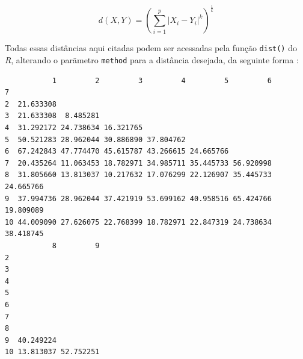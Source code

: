 \documentclass[
  letterpaper,
  DIV=11,
  numbers=noendperiod]{scrreprt}
\newenvironment{Shaded}{\begin{snugshade}}{\end{snugshade}}
\newcommand{\AttributeTok}[1]{\textcolor[rgb]{0.40,0.45,0.13}{#1}}
\newcommand{\DecValTok}[1]{\textcolor[rgb]{0.68,0.00,0.00}{#1}}
\newcommand{\FunctionTok}[1]{\textcolor[rgb]{0.28,0.35,0.67}{#1}}
\newcommand{\NormalTok}[1]{\textcolor[rgb]{0.00,0.23,0.31}{#1}}
\newcommand{\OtherTok}[1]{\textcolor[rgb]{0.00,0.23,0.31}{#1}}
\newcommand{\SpecialCharTok}[1]{\textcolor[rgb]{0.37,0.37,0.37}{#1}}
\newcommand{\StringTok}[1]{\textcolor[rgb]{0.13,0.47,0.30}{#1}}
\begin{document}
\[
d(X,Y) = \left(\sum^p_{i=1}|X_i - Y_i|^k\right)^\frac{1}{k}
\]

Todas essas distâncias aqui citadas podem ser acessadas pela função
\texttt{dist()} do \emph{R}, alterando o parãmetro \texttt{method} para
a distância desejada, da seguinte forma :

\begin{Shaded}
\end{Shaded}

\begin{verbatim}
           1         2         3         4         5         6         7
2  21.633308                                                            
3  21.633308  8.485281                                                  
4  31.292172 24.738634 16.321765                                        
5  50.521283 28.962044 30.886890 37.804762                              
6  67.242843 47.774470 45.615787 43.266615 24.665766                    
7  20.435264 11.063453 18.782971 34.985711 35.445733 56.920998          
8  31.805660 13.813037 10.217632 17.076299 22.126907 35.445733 24.665766
9  37.994736 28.962044 37.421919 53.699162 40.958516 65.424766 19.809089
10 44.009090 27.626075 22.768399 18.782971 22.847319 24.738634 38.418745
           8         9
2                     
3                     
4                     
5                     
6                     
7                     
8                     
9  40.249224          
10 13.813037 52.752251
\end{verbatim}
\end{document}

